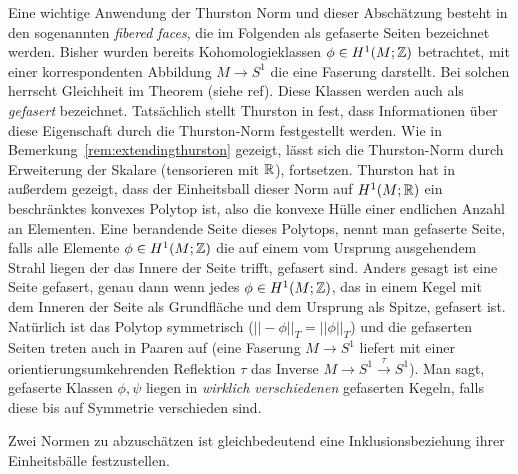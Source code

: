     \begin{bsp}
    \label{ex:fiberedfaces}
        Eine wichtige Anwendung der Thurston Norm und dieser Abschätzung besteht in den sogenannten \textit{fibered faces}, die im Folgenden als gefaserte Seiten bezeichnet werden. Bisher wurden bereits Kohomologieklassen $\phi \in H^1(M;\mathbb{Z})$ betrachtet, mit einer korrespondenten Abbildung $M \to S^1$ die eine Faserung darstellt. Bei solchen herrscht Gleichheit im Theorem (siehe ref). Diese Klassen werden auch als \textit{gefasert} bezeichnet. Tatsächlich stellt Thurston in \cite{Thurston.1986} fest, dass Informationen über diese Eigenschaft durch die Thurston-Norm festgestellt werden. Wie in Bemerkung~\ref{rem:extendingthurston} gezeigt, lässt sich die Thurston-Norm durch Erweiterung der Skalare (tensorieren mit $\mathbb{R}$), fortsetzen. Thurston hat in \cite{Thurston.1986} außerdem gezeigt, dass der Einheitsball dieser Norm auf $H^1(M;\mathbb{R})$ ein beschränktes konvexes Polytop ist, also die konvexe Hülle einer endlichen Anzahl an Elementen. Eine berandende Seite dieses Polytops, nennt man gefaserte Seite, falls alle Elemente $\phi \in H^1(M;\mathbb{Z})$ die auf einem vom Ursprung ausgehendem Strahl liegen der das Innere der Seite trifft, gefasert sind. Anders gesagt ist eine Seite gefasert, genau dann wenn jedes $\phi \in H^1(M;\mathbb{Z})$, das in einem Kegel mit dem Inneren der Seite als Grundfläche und dem Ursprung als Spitze, gefasert ist. Natürlich ist das Polytop symmetrisch ($||-\phi||_T=||\phi||_T$) und die gefaserten Seiten treten auch in Paaren auf (eine Faserung $M \to S^1$ liefert mit einer orientierungsumkehrenden Reflektion $\tau$ das Inverse $M \to S^1 \stackrel \tau \to S^1$). Man sagt, gefaserte Klassen $\phi,\psi$ liegen in \textit{wirklich verschiedenen} gefaserten Kegeln, falls diese bis auf Symmetrie verschieden sind. 
    \end{bsp}

    \begin{bem}
        Zwei Normen zu abzuschätzen ist gleichbedeutend eine Inklusionsbeziehung ihrer Einheitsbälle festzustellen.
    \end{bem}

